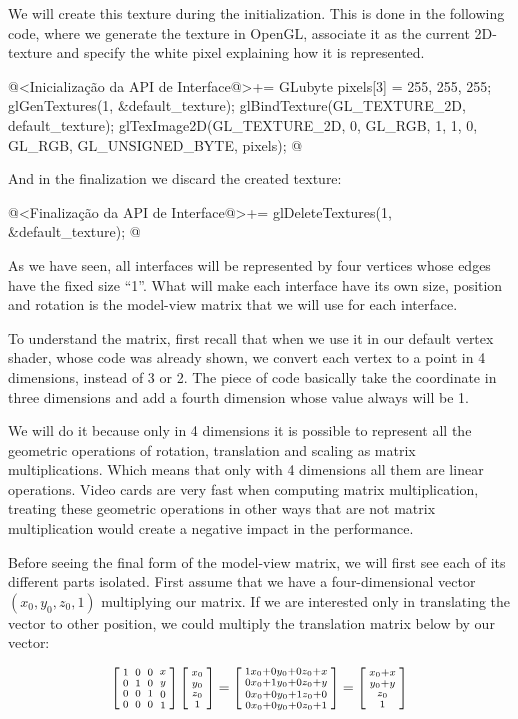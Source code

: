We will create this texture during the initialization. This is done in
the following code, where we generate the texture in OpenGL, associate
it as the current 2D-texture and specify the white pixel explaining
how it is represented.

\iniciocodigo
@<Inicialização da API de Interface@>+=
{
  GLubyte pixels[3] = {255, 255, 255};
  glGenTextures(1, &default_texture);
  glBindTexture(GL_TEXTURE_2D, default_texture);
  glTexImage2D(GL_TEXTURE_2D, 0, GL_RGB, 1, 1, 0, GL_RGB, GL_UNSIGNED_BYTE,
               pixels);
}
@
\fimcodigo

And in the finalization we discard the created texture:

\iniciocodigo
@<Finalização da API de Interface@>+=
glDeleteTextures(1, &default_texture);
@
\fimcodigo


As we have seen, all interfaces will be represented by four vertices
whose edges have the fixed size ``1''. What will make each interface
have its own size, position and rotation is the model-view matrix that
we will use for each interface.

To understand the matrix, first recall that when we use it in our
default vertex shader, whose code was already shown, we convert each
vertex to a point in 4 dimensions, instead of 3 or 2. The piece of
code  basically take the
coordinate in three dimensions and add a fourth dimension whose value
always will be 1.

We will do it because only in 4 dimensions it is possible to represent
all the geometric operations of rotation, translation and scaling as
matrix multiplications. Which means that only with 4 dimensions all
them are linear operations. Video cards are very fast when computing
matrix multiplication, treating these geometric operations in other
ways that are not matrix multiplication would create a negative impact
in the performance.

Before seeing the final form of the model-view matrix, we will first
see each of its different parts isolated. First assume that we have a
four-dimensional vector $(x_0, y_0, z_0, 1)$ multiplying our
matrix. If we are interested only in translating the vector to other
position, we could multiply the translation matrix below by our
vector:

$$ \left[{{1 \atop 0}\atop {0\atop 0}}{{0 \atop 1}\atop {0 \atop
      0}}{{0\atop 0}\atop{1 \atop 0}}{{x \atop y}\atop{0\atop
      1}}\right]\left[{{x_0\atop y_0}\atop {z_0\atop
      1}}\right]=\left[{{1x_0+0y_0+0z_0+x\atop 0x_0+1y_0+0z_0+y}\atop
    {0x_0+0y_0+1z_0+0\atop
      0x_0+0y_0+0z_0+1}}\right]=\left[{{x_0+x\atop y_0+y}\atop
    {z_0\atop 1}}\right]
$$


